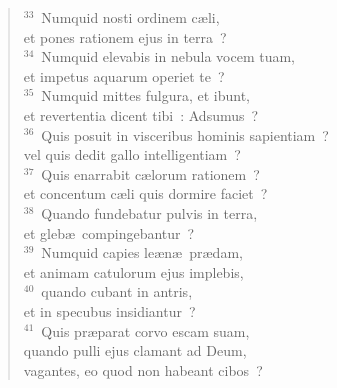 \begin{flushleft}
\begin{verse}
${}^{33}$~Numquid nosti ordinem c\ae li,\\ et pones rationem ejus in terra~?\\
${}^{34}$~Numquid elevabis in nebula vocem tuam,\\ et impetus aquarum operiet te~?\\
${}^{35}$~Numquid mittes fulgura, et ibunt,\\ et revertentia dicent tibi~: Adsumus~?\\
${}^{36}$~Quis posuit in visceribus hominis sapientiam~?\\ vel quis dedit gallo intelligentiam~?\\
${}^{37}$~Quis enarrabit c\ae lorum rationem~?\\ et concentum c\ae li quis dormire faciet~?\\
${}^{38}$~Quando fundebatur pulvis in terra,\\ et gleb\ae\ compingebantur~?\\
${}^{39}$~Numquid capies le\ae n\ae\ pr\ae dam,\\ et animam catulorum ejus implebis,\\
${}^{40}$~quando cubant in antris,\\ et in specubus insidiantur~?\\
${}^{41}$~Quis pr\ae parat corvo escam suam,\\ quando pulli ejus clamant ad Deum,\\ vagantes, eo quod non habeant cibos~?\end{verse}\end{flushleft}


